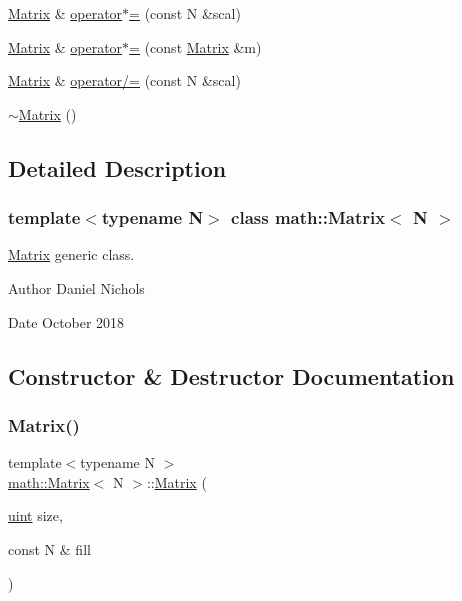 \begin{DoxyCompactItemize}
\item 
\hyperlink{classmath_1_1Matrix}{Matrix} \& \hyperlink{classmath_1_1Matrix_a1704c2b9fd200a6854b6793524a15700}{operator$\ast$=} (const N \&scal)
\item 
\hyperlink{classmath_1_1Matrix}{Matrix} \& \hyperlink{classmath_1_1Matrix_a4dbf1e0c5f42ce314ea2510a025b7e2a}{operator$\ast$=} (const \hyperlink{classmath_1_1Matrix}{Matrix} \&m)
\item 
\hyperlink{classmath_1_1Matrix}{Matrix} \& \hyperlink{classmath_1_1Matrix_a1145a22a8fa63ae3b8901184dd665e3a}{operator/=} (const N \&scal)
\item 
\hyperlink{classmath_1_1Matrix_afd52712eaef5a16115d605b7866a0576}{$\sim$\+Matrix} ()
\end{DoxyCompactItemize}


\subsection{Detailed Description}
\subsubsection*{template$<$typename N$>$\newline
class math\+::\+Matrix$<$ N $>$}

\hyperlink{classmath_1_1Matrix}{Matrix} generic class. 

\begin{DoxyAuthor}{Author}
Daniel Nichols 
\end{DoxyAuthor}
\begin{DoxyDate}{Date}
October 2018 
\end{DoxyDate}


\subsection{Constructor \& Destructor Documentation}
\mbox{\label{classmath_1_1Matrix_ab10d09aaec4eac52e268e1efe03fd98d}} 
\subsubsection{\texorpdfstring{Matrix()}{Matrix()}\hspace{0.1cm}{\footnotesize\ttfamily [1/7]}}
{\footnotesize\ttfamily template$<$typename N $>$ \\
\hyperlink{classmath_1_1Matrix}{math\+::\+Matrix}$<$ N $>$\+::\hyperlink{classmath_1_1Matrix}{Matrix} (\begin{DoxyParamCaption}\item[{\hyperlink{typedefs_8h_a7b9b9413622e67b9df7f2d090b48682b}{uint}}]{size,  }\item[{const N \&}]{fill }\end{DoxyParamCaption})}

